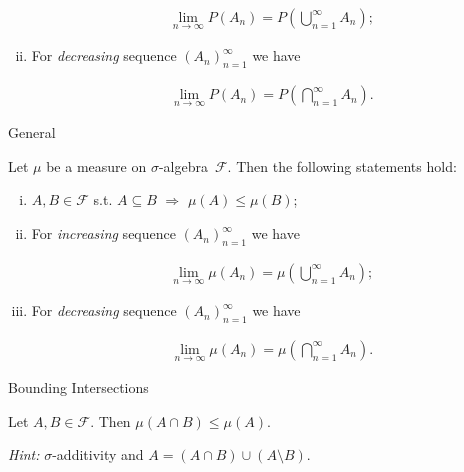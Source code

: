 \documentclass[10pt,landscape]{article}
\renewcommand{\leq}{\leqslant}
\newcommand{\Hint}{\textit{Hint: }}
\newcommand{\SigmaAlgebra}{$\sigma$-algebra}
\newcommand{\CalF}{\mathcal{F}}
\begin{document}
\begin{multicols}{3}
\begin{proposition}{1.2}{}
\begin{enumerate}[(i)]
                \begin{align*}
                    \lim_{n \to \infty} P(A_n) = P\left(\bigcup_{n=1}^{\infty} A_n \right);
                \end{align*}
            \item For \emph{decreasing} sequence $(A_n)_{n=1}^{\infty}$ we have

                \begin{align*}
                    \lim_{n \to \infty} P(A_n) = P\left(\bigcap_{n=1}^{\infty} A_n \right).
                \end{align*}
        \end{enumerate}

\end{proposition}

\begin{proposition}{1.2}{General}

    Let $\mu$ be a measure on \SigmaAlgebra\ $\CalF$. Then the following statements hold:

        \begin{enumerate}[(i)]
            \item $A, B \in \CalF$ s.t. $A \subseteq B$ $\Rightarrow$ $\mu(A) \leq \mu(B)$;
            \item For \emph{increasing} sequence $(A_n)_{n=1}^{\infty}$ we have

                \begin{align*}
                    \lim_{n \to \infty} \mu(A_n) = \mu\left(\bigcup_{n=1}^{\infty} A_n \right);
                \end{align*}
            \item For \emph{decreasing} sequence $(A_n)_{n=1}^{\infty}$ we have

                \begin{align*}
                    \lim_{n \to \infty} \mu(A_n) = \mu\left(\bigcap_{n=1}^{\infty} A_n \right).
                \end{align*}
        \end{enumerate}

\end{proposition}

\begin{proposition}{}{Bounding Intersections}

    Let $A, B \in \CalF$. Then $\mu(A \cap B) \leq \mu(A)$.

    \Hint $\sigma$-additivity and $A = (A \cap B) \cup (A \setminus B)$.


\end{proposition}
\end{multicols}
\end{document}
